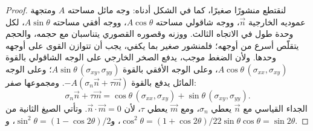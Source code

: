 \begin{proof}
لنقتطع منشورًا صغيرًا، كما في الشكل أدناه: وجه مائل مساحته $A$ ومتجهة عموديه الخارجية $\vec n$، ووجه شاقولي مساحته $A\cos\theta$، ووجه أفقي مساحته $A\sin\theta$، لكل وحدة طول في الاتجاه الثالث. ووزنه وقصوره القصوري يتناسبان مع حجمه، والحجم يتقلّص أسرع من أوجهه؛ فلمنشور صغير بما يكفي، يجب أن تتوازن القوى على أوجهه وحدها. ولأن الضغط موجب، يدفع الصخر الخارجي على الوجه الشاقولي بالقوة $A\cos\theta\,(\sigma_{xx}, \sigma_{xy})$، وعلى الوجه الأفقي بالقوة $A\sin\theta\,(\sigma_{xy}, \sigma_{yy})$؛ وعلى الوجه المائل يدفع بالقوة $-A(\sigma_n\vec n + \tau\vec m)$. ومجموعها صفر:
\[
  \sigma_n\vec n + \tau\vec m = \cos\theta\,(\sigma_{xx}, \sigma_{xy}) + \sin\theta\,(\sigma_{xy}, \sigma_{yy}) .
\]
الجداء القياسي مع $\vec n$ يعطي $\sigma_n$، ومع $\vec m$ يعطي $\tau$، لأن $\vec n\cdot\vec m = 0$. وتأتي الصيغ الثانية من $\cos^2\theta = (1+\cos2\theta)/2$، و$\sin^2\theta = (1-\cos2\theta)/2$، و$2\sin\theta\cos\theta = \sin2\theta$.
\end{proof}

